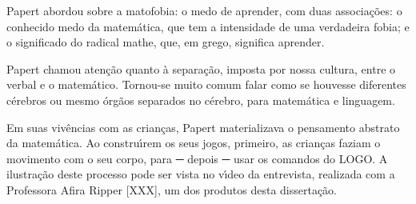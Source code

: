 \documentclass[
12pt,		%
openright,	%
twoside,  %
a4paper,			%
chapter=TITLE,		%
english,			%
french,				%
spanish,			%
brazil				%
]{USPSC-classe/USPSC_RedarTex}
\begin{document}
Papert abordou sobre a \textquotedbl matofobia: o medo de aprender\textquotedbl , com duas associa\c{c}\~oes: o conhecido medo da matem\'atica, que tem a intensidade de uma verdadeira fobia; e o  significado do radical mathe, que, em grego, significa aprender.











\noindent\begin{center}\mbox{\centering{}}\end{center}


Papert chamou aten\c{c}\~ao quanto \`a separa\c{c}\~ao, imposta por nossa cultura, entre o verbal e o matem\'atico. Tornou-se muito comum falar como se houvesse diferentes c\'erebros ou mesmo \'org\~aos separados no c\'erebro, para matem\'atica e linguagem.










Em suas viv\^encias com as crian\c{c}as, Papert materializava o pensamento abstrato da matem\'atica. Ao constru\'{\i}rem os seus jogos, primeiro, as crian\c{c}as faziam o movimento com o seu corpo, para ─ depois  ─ usar os comandos do LOGO. A ilustra\c{c}\~ao deste processo pode ser vista no v\'{\i}deo  da entrevista, realizada com a Professora Afira Ripper [XXX],  um dos produtos desta disserta\c{c}\~ao.
\end{document}
